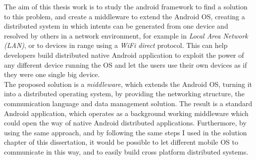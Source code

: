 The aim of this thesis work is to study the android framework to find a solution to this problem, and create a middleware to extend the Android OS, creating a distributed system in which intents can be generated from one device and resolved by others in a network environment, for example in \textit{Local Area Network (LAN)}, or to devices in range using a \textit{WiFi direct} protocol. This can help developers build distributed native Android application to exploit the power of any different device running the OS and let the users use their own devices as if they were one single big device.\\
The proposed solution is a \textit{middleware}, which extends the Android OS, turning it into a distributed operating system, by providing the networking structure, the communication language and data management solution. The result is a standard Android application, which operates as a background working middleware which could open the way of native Android distributed applications. Furthermore, by using the same approach, and by following the same steps I used in the solution chapter of this dissertation, it would be possible to let different mobile OS to communicate in this way, and to easily build cross platform distributed systems.

%
%
